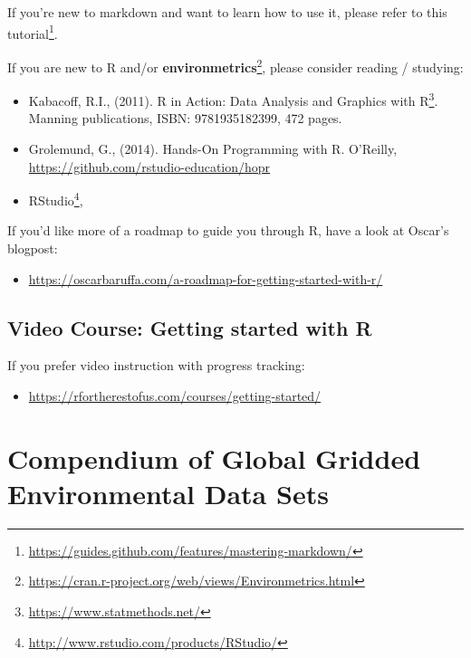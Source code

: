 \documentclass[
  graybox,natbib,nospthms]{svmono}
\providecommand{\tightlist}{%
  \setlength{\itemsep}{0pt}\setlength{\parskip}{0pt}}
\providecommand{\tightlist}{\setlength{\itemsep}{0pt}\setlength{\parskip}{0pt}}
\renewcommand{\href}[2]{#2 (\url{#1})}
\renewcommand{\href}[2]{#2\footnote{\url{#1}}}
\begin{document}
If you're new to markdown and want to learn how to use it, please refer to \href{https://guides.github.com/features/mastering-markdown/}{this tutorial}.

If you are new to R and/or \href{https://cran.r-project.org/web/views/Environmetrics.html}{\textbf{environmetrics}}, please consider reading / studying:

\begin{itemize}
\tightlist
\item
  Kabacoff, R.I., (2011). \href{https://www.statmethods.net/}{R in Action: Data Analysis and Graphics with R}. Manning publications, ISBN: 9781935182399, 472 pages.\\
\item
  Grolemund, G., (2014). Hands-On Programming with R. O'Reilly, \url{https://github.com/rstudio-education/hopr}\\
\item
  \href{http://www.rstudio.com/products/RStudio/}{RStudio},
\end{itemize}

If you'd like more of a roadmap to guide you through R, have a look at Oscar's blogpost:

\begin{itemize}
\tightlist
\item
  \url{https://oscarbaruffa.com/a-roadmap-for-getting-started-with-r/}
\end{itemize}

\hypertarget{video-course-getting-started-with-r}{%
\section{Video Course: Getting started with R}\label{video-course-getting-started-with-r}}

If you prefer video instruction with progress tracking:

\begin{itemize}
\tightlist
\item
  \url{https://rfortherestofus.com/courses/getting-started/}
\end{itemize}

\hypertarget{compendium-of-global-gridded-environmental-data-sets}{%
\chapter{Compendium of Global Gridded Environmental Data Sets}\label{compendium-of-global-gridded-environmental-data-sets}}
\end{document}
